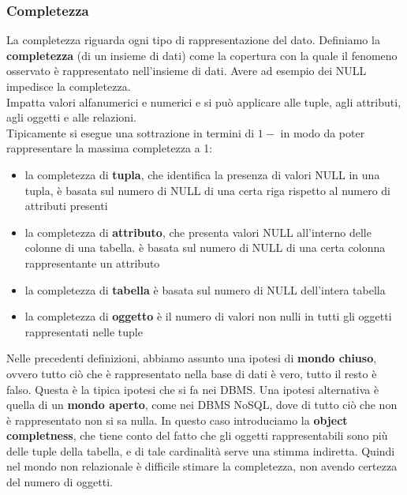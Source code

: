 \subsubsection{Completezza}
La completezza riguarda ogni tipo di rappresentazione del dato. Definiamo la \textbf{completezza} (di un insieme di dati) come la copertura con la quale il fenomeno osservato è rappresentato nell'insieme di dati. Avere ad esempio dei NULL impedisce la completezza.\\ Impatta valori alfanumerici e numerici e si può applicare alle tuple, agli attributi, agli oggetti e alle relazioni.\\
Tipicamente si esegue una sottrazione in termini di $1-$ in modo da poter rappresentare la massima completezza a 1:
\begin{itemize}
    \item la completezza di \textbf{tupla}, che identifica la presenza di valori NULL in una tupla, è basata sul numero di NULL di una certa riga rispetto al numero di attributi presenti
    \item la completezza di \textbf{attributo}, che presenta valori NULL all'interno delle colonne di una tabella. è basata sul numero di NULL di una certa colonna rappresentante un attributo
    \item la completezza di \textbf{tabella} è basata sul numero di NULL dell'intera tabella 
    \item la completezza di \textbf{oggetto} è il numero di valori non nulli in tutti gli oggetti rappresentati nelle tuple 
\end{itemize}

Nelle precedenti definizioni, abbiamo assunto una ipotesi di \textbf{mondo chiuso}, ovvero tutto ciò che è rappresentato nella base di dati è vero, tutto il resto è falso. Questa è la tipica ipotesi che si fa nei DBMS. Una ipotesi alternativa è quella di un \textbf{mondo aperto}, come nei DBMS NoSQL, dove di tutto ciò che non è rappresentato non si sa nulla. In questo caso introduciamo la \textbf{object completness}, che tiene conto del fatto che gli oggetti rappresentabili sono più delle tuple della tabella, e di tale cardinalità serve una stimma indiretta. Quindi nel mondo non relazionale è difficile stimare la completezza, non avendo certezza del numero di oggetti.
